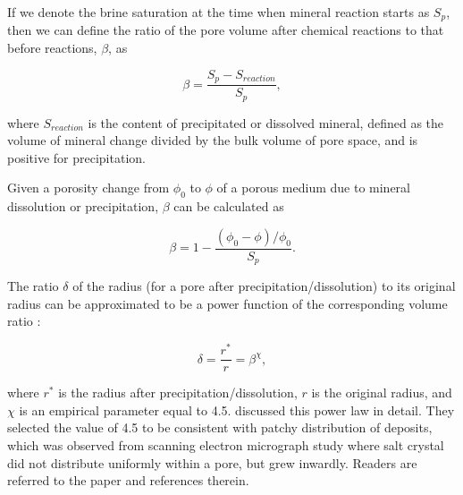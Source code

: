 \documentclass[preprint,12pt,authoryear]{elsarticle}
\begin{document}
If we denote the brine saturation at the time when mineral reaction starts as $S_p$, then we can define the ratio of the pore volume after chemical reactions to that before reactions, $\beta$, as

\begin{equation}
\label{eq:beta} 
\beta=\dfrac{S_p-S_{reaction}}{S_p},
\end{equation}

where $S_{reaction}$ is the content of precipitated or dissolved mineral, defined as the volume of mineral change divided by the bulk volume of pore space, and is positive for precipitation. 


Given a porosity change from $\phi_0$ to $\phi$ of a porous medium due to mineral dissolution or precipitation, $\beta$ can be calculated as 

\begin{equation}
\label{eq:beta_porosity}
\beta = 1-\dfrac{(\phi_0-\phi)/\phi_0}{S_p}.
\end{equation}  


The ratio $\delta$ of the radius (for a pore after precipitation/dissolution) to its original radius can be approximated to be a power function of the corresponding volume ratio \citep{liu2013permeability}:

\begin{equation}
\label{eq:delta} 
\delta=\dfrac{r^*}{r}=\beta^{\chi},
\end{equation}


where $r^*$ is the radius after precipitation/dissolution, $r$ is the original radius, and $\chi$ is an empirical parameter equal to 4.5. \cite{liu2013permeability} discussed this power law in detail. They selected the value of 4.5 to be consistent with patchy distribution of deposits, which was observed from scanning electron micrograph study where salt crystal did not distribute uniformly within a pore, but grew inwardly. Readers are referred to the \cite{liu2013permeability} paper and references therein.
\end{document}
